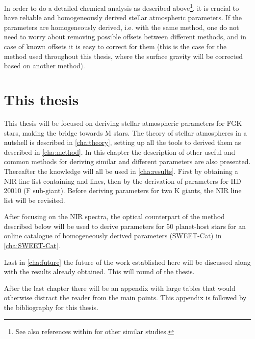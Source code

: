 In order to do a detailed chemical analysis as described above\footnote{See also references within
\citet{Adibekyan2012} for other similar studies.}, it is crucial to have reliable and homogeneously
derived stellar atmospheric parameters. If the parameters are homogeneously derived, i.e. with the
same method, one do not need to worry about removing possible offsets between different methods, and
in case of known offsets it is easy to correct for them (this is the case for the method used
throughout this thesis, where the surface gravity will be corrected based on another method).


\section{This thesis}
\label{sec:this_thesis}

This thesis will be focused on deriving stellar atmospheric parameters for FGK stars, making the
bridge towards M stars. The theory of stellar atmospheres in a nutshell is described in
\cref{cha:theory}, setting up all the tools to derived them as described in \cref{cha:method}. In
this chapter the description of other useful and common methods for deriving similar and different
parameters are also presented. Thereafter the knowledge will all be used in \cref{cha:results}.
First by obtaining a NIR line list containing  and  lines, then by the
derivation of parameters for HD 20010 (F sub-giant). Before deriving parameters for two K giants,
the NIR line list will be revisited.

After focusing on the NIR spectra, the optical counterpart of the method described below will be
used to derive parameters for 50 planet-host stars for an online catalogue of homogeneously derived
parameters (SWEET-Cat) in \cref{cha:SWEET-Cat}.

Last in \cref{cha:future} the future of the work established here will be discussed along with the
results already obtained. This will round of the thesis.

After the last chapter there will be an appendix with large tables that would otherwise distract the
reader from the main points. This appendix is followed by the bibliography for this thesis.
